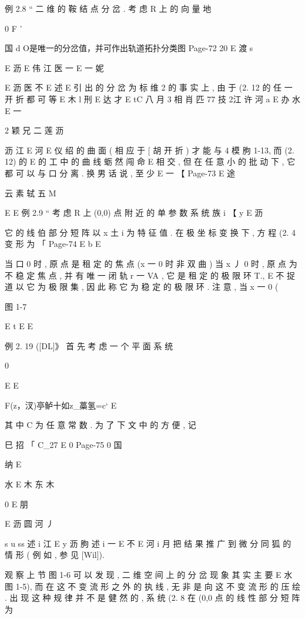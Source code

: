 {例 2.8 “ 二 维 的 鞍 结 点 分 岔 . 考 虑 R 上 的 向 量 地

{ 0
F '

国 d O是唯一的分岔值，并可作出轨道拓扑分类图
Page-72
20 E 渡 s

E 沥
E 伟 江 医 一
E 一
妮

E 沥 医 不
E 述 E
引 出 的 分 岔 为 标 维 2 的 事 实 上 , 由 于 (2. 12 的 任 一 开 折 都 可 等
E 木
l 刑
E 达 才
E
tC 八 月 3 相 肖 匹 77 技 2江 许 河 a E 办 水
E 一

2 颖 兄 二 莲 沥

沥 江
E
河
E 仪
绍 的 曲 面 ( 相 应 于
[ 胡
开 折 ) 才 能 与 4 模
朐
1-13, 而 (2. 12) 的
E
的 工 中 的 曲 线 蛎 然 闯 命
E
相 交 , 但 在 任 意 小 的 批 动 下 , 它 都 可 以 与 口 分 离 . 换 男 话 说 , 至 少
E 一
【
Page-73
E 途

云 素 轼
五 M

E
E
例 2.9 “ 考 虑 R 上 (0,0) 点 附 近 的 单 参 数 系 统 族
i
【 y
E 沥

它 的 线 伯 部 分 短 阵 以 x 土 i 为 特 征 值 . 在 极 坐 标 变 换 下 , 方 程 (2. 4
变 形 为 「
Page-74
E b E

当 口 0 时 , 原 点 是 租 定 的 焦 点 (x 一 0 时 非 双 曲 ) 当 x 丿 0 时 , 原
点 为 不 稳 定 焦 点 , 并 有 唯 一 闭 轨 r 一 VA , 它 是 租 定 的 极 限 环 T.,
E 不
捉 道 以 它 为 极 限 集 , 因 此 称 它 为 稳 定 的 极 限 环 . 注 意 , 当 x 一 0
(

图 1-7

E t
E
E

例 2. 19 ([DL]》 首 先 考 虑 一 个 平 面 系 统

0

E
E

F(z，汊)亭鲈十如z_藁氢=c` E

其 中 C 为 任 意 常 数 . 为 了 下 文 中 的 方 便 , 记

巳 招 「
C_27 E 0
Page-75
0 国

纳
E

水
E 木 东 木

0
E 朋

E 沥 圆 河 丿

s
u ss 述 i 江
E y 沥 朐 述 i 一
E 不
E 河 i 月
把 结 果 推 广 到 微 分 同 狐 的 情 形 ( 例 如 , 参 见 [Wil]).

观 察 上 节 图 1-6 可 以 发 现 , 二 维 空 间 上 的 分 岔 现 象 其 实 主 要
E 水
图 1-5), 而 在 这 不 变 流 形 之 外 的 执 线 , 无 非 是 向 这 不 变 流 形 的 压
绘 . 出 现 这 种 规 律 并 不 是 健 然 的 , 系 统 (2. 8 在 (0,0 点 的 线 性 部
分 短 阵 为

}}
